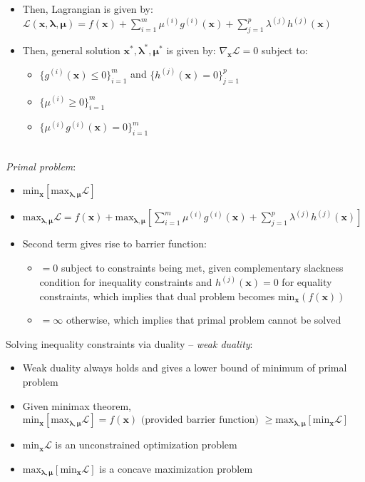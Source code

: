 \begin{itemize}
    \item Then, Lagrangian is given by: $\mathcal{L}(\boldsymbol{x},\boldsymbol{\lambda},\boldsymbol{\mu}) = f(\boldsymbol{x}) + \sum_{i=1}^m \mu^{(i)} g^{(i)}(\boldsymbol{x}) + \sum_{j=1}^p \lambda^{(j)} h^{(j)}(\boldsymbol{x})$
    \item Then, general solution $\boldsymbol{x^*},\boldsymbol{\lambda^*},\boldsymbol{\mu^*}$ is given by: $\nabla_{\boldsymbol{x}} \mathcal{L} = 0$ subject to:
    \begin{itemize}
        \item $\{g^{(i)}(\boldsymbol{x}) \leq 0\}_{i=1}^m$ and $\{h^{(j)}(\boldsymbol{x}) = 0\}_{j=1}^p$ 
        \item $\{\mu^{(i)} \geq 0\}_{i=1}^m$
        \item $\{\mu^{(i)}g^{(i)}(\boldsymbol{x}) = 0\}_{i=1}^m$
    \end{itemize}
\end{itemize}\\
\emph{Primal problem}:
\begin{itemize}
    \item $\textrm{min}_{\boldsymbol{x}} [\textrm{max}_{\boldsymbol{\lambda},\boldsymbol{\mu}} \mathcal{L}]$
    \item $\textrm{max}_{\boldsymbol{\lambda},\boldsymbol{\mu}} \mathcal{L} = f(\boldsymbol{x}) + \textrm{max}_{\boldsymbol{\lambda},\boldsymbol{\mu}} [\sum_{i=1}^m \mu^{(i)} g^{(i)}(\boldsymbol{x}) + \sum_{j=1}^p \lambda^{(j)} h^{(j)}(\boldsymbol{x})]$
    \item Second term gives rise to barrier function:
    \begin{itemize}
        \item $= 0$ subject to constraints being met, given complementary slackness condition for inequality constraints and $h^{(j)}(\boldsymbol{x}) = 0$ for equality constraints, which implies that dual problem becomes $\textrm{min}_{\boldsymbol{x}}(f(\boldsymbol{x}))$
        \item $= \infty$ otherwise, which implies that primal problem cannot be solved
    \end{itemize}
\end{itemize}
Solving inequality constraints via duality – \emph{weak duality}:
\begin{itemize}
    \item Weak duality always holds and gives a lower bound of minimum of primal problem
    \item Given minimax theorem, $\textrm{min}_{\boldsymbol{x}} [\textrm{max}_{\boldsymbol{\lambda},\boldsymbol{\mu}} \mathcal{L}] = f(\boldsymbol{x}) \textrm{ (provided barrier function) } \geq \textrm{max}_{\boldsymbol{\lambda},\boldsymbol{\mu}} [\textrm{min}_{\boldsymbol{x}} \mathcal{L}]$
    \item $\textrm{min}_{\boldsymbol{x}} \mathcal{L}$ is an unconstrained optimization problem 
    \item $\textrm{max}_{\boldsymbol{\lambda},\boldsymbol{\mu}} [\textrm{min}_{\boldsymbol{x}} \mathcal{L}]$ is a concave maximization problem 
\end{itemize}

